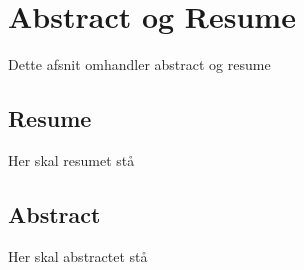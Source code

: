 \chapter{Abstract og Resume}\label{ch:abstract}
Dette afsnit omhandler abstract og resume

\section{Resume}
Her skal resumet stå

\section{Abstract}
Her skal abstractet stå



